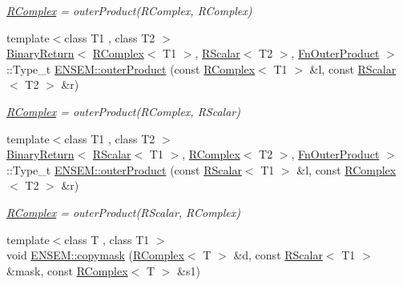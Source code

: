 \begin{DoxyCompactItemize}
\begin{DoxyCompactList}\small\item\em \mbox{\hyperlink{classENSEM_1_1RComplex}{R\+Complex}} = outer\+Product(\+R\+Complex, R\+Complex) \end{DoxyCompactList}\item 
{\footnotesize template$<$class T1 , class T2 $>$ }\\\mbox{\hyperlink{structENSEM_1_1BinaryReturn}{Binary\+Return}}$<$ \mbox{\hyperlink{classENSEM_1_1RComplex}{R\+Complex}}$<$ T1 $>$, \mbox{\hyperlink{classENSEM_1_1RScalar}{R\+Scalar}}$<$ T2 $>$, \mbox{\hyperlink{structENSEM_1_1FnOuterProduct}{Fn\+Outer\+Product}} $>$\+::Type\+\_\+t \mbox{\hyperlink{group__rcomplex_ga3452d86b3ff7fc9db6565959c2f896db}{E\+N\+S\+E\+M\+::outer\+Product}} (const \mbox{\hyperlink{classENSEM_1_1RComplex}{R\+Complex}}$<$ T1 $>$ \&l, const \mbox{\hyperlink{classENSEM_1_1RScalar}{R\+Scalar}}$<$ T2 $>$ \&r)
\begin{DoxyCompactList}\small\item\em \mbox{\hyperlink{classENSEM_1_1RComplex}{R\+Complex}} = outer\+Product(\+R\+Complex, R\+Scalar) \end{DoxyCompactList}\item 
{\footnotesize template$<$class T1 , class T2 $>$ }\\\mbox{\hyperlink{structENSEM_1_1BinaryReturn}{Binary\+Return}}$<$ \mbox{\hyperlink{classENSEM_1_1RScalar}{R\+Scalar}}$<$ T1 $>$, \mbox{\hyperlink{classENSEM_1_1RComplex}{R\+Complex}}$<$ T2 $>$, \mbox{\hyperlink{structENSEM_1_1FnOuterProduct}{Fn\+Outer\+Product}} $>$\+::Type\+\_\+t \mbox{\hyperlink{group__rcomplex_ga5f17e33943ff2fbe7237c0aa4182d06c}{E\+N\+S\+E\+M\+::outer\+Product}} (const \mbox{\hyperlink{classENSEM_1_1RScalar}{R\+Scalar}}$<$ T1 $>$ \&l, const \mbox{\hyperlink{classENSEM_1_1RComplex}{R\+Complex}}$<$ T2 $>$ \&r)
\begin{DoxyCompactList}\small\item\em \mbox{\hyperlink{classENSEM_1_1RComplex}{R\+Complex}} = outer\+Product(\+R\+Scalar, R\+Complex) \end{DoxyCompactList}\item 
{\footnotesize template$<$class T , class T1 $>$ }\\void \mbox{\hyperlink{group__rcomplex_ga8228a6185ea266e1e7d4c221c76bd5f1}{E\+N\+S\+E\+M\+::copymask}} (\mbox{\hyperlink{classENSEM_1_1RComplex}{R\+Complex}}$<$ T $>$ \&d, const \mbox{\hyperlink{classENSEM_1_1RScalar}{R\+Scalar}}$<$ T1 $>$ \&mask, const \mbox{\hyperlink{classENSEM_1_1RComplex}{R\+Complex}}$<$ T $>$ \&s1)

\end{DoxyCompactItemize}
